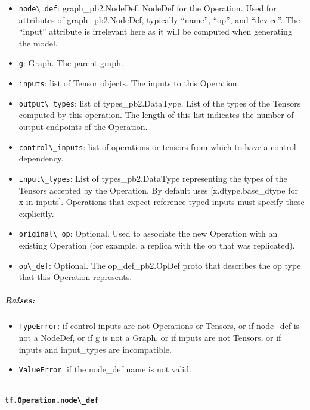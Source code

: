 \begin{itemize}
\tightlist
\item
  \lstinline{node\_def}: graph\_pb2.NodeDef. NodeDef for the Operation.
  Used for attributes of graph\_pb2.NodeDef, typically ``name'', ``op'',
  and ``device''. The ``input'' attribute is irrelevant here as it will
  be computed when generating the model.
\item
  \lstinline{g}: Graph. The parent graph.
\item
  \lstinline{inputs}: list of Tensor objects. The inputs to this Operation.
\item
  \lstinline{output\_types}: list of types\_pb2.DataType. List of the types
  of the Tensors computed by this operation. The length of this list
  indicates the number of output endpoints of the Operation.
\item
  \lstinline{control\_inputs}: list of operations or tensors from which to
  have a control dependency.
\item
  \lstinline{input\_types}: List of types\_pb2.DataType representing the
  types of the Tensors accepted by the Operation. By default uses
  {[}x.dtype.base\_dtype for x in inputs{]}. Operations that expect
  reference-typed inputs must specify these explicitly.
\item
  \lstinline{original\_op}: Optional. Used to associate the new Operation
  with an existing Operation (for example, a replica with the op that
  was replicated).
\item
  \lstinline{op\_def}: Optional. The op\_def\_pb2.OpDef proto that
  describes the op type that this Operation represents.
\end{itemize}

\subparagraph{Raises: }\label{raises-7}

\begin{itemize}
\tightlist
\item
  \lstinline{TypeError}: if control inputs are not Operations or Tensors,
  or if node\_def is not a NodeDef, or if g is not a Graph, or if inputs
  are not Tensors, or if inputs and input\_types are incompatible.
\item
  \lstinline{ValueError}: if the node\_def name is not valid.
\end{itemize}

\begin{center}\rule{0.5\linewidth}{\linethickness}\end{center}

\paragraph{\texorpdfstring{\lstinline{tf.Operation.node\_def}
}{tf.Operation.node\_def }}\label{tf.operation.nodeux5fdef}

